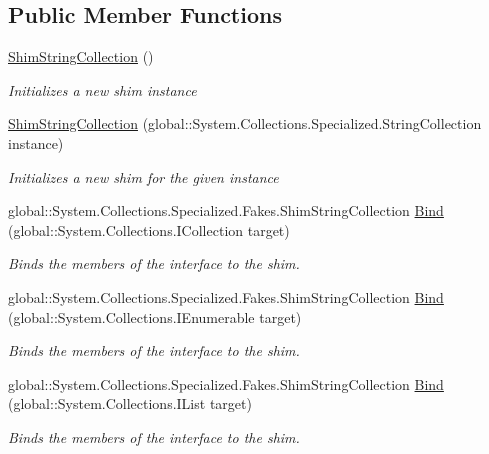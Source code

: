 \subsection*{Public Member Functions}
\begin{DoxyCompactItemize}
\item 
\hyperlink{class_system_1_1_collections_1_1_specialized_1_1_fakes_1_1_shim_string_collection_ad6c6bfb90004ff86028ca6973d882e50}{Shim\-String\-Collection} ()
\begin{DoxyCompactList}\small\item\em Initializes a new shim instance\end{DoxyCompactList}\item 
\hyperlink{class_system_1_1_collections_1_1_specialized_1_1_fakes_1_1_shim_string_collection_ada5384134f950c1ab68169c5650b3f74}{Shim\-String\-Collection} (global\-::\-System.\-Collections.\-Specialized.\-String\-Collection instance)
\begin{DoxyCompactList}\small\item\em Initializes a new shim for the given instance\end{DoxyCompactList}\item 
global\-::\-System.\-Collections.\-Specialized.\-Fakes.\-Shim\-String\-Collection \hyperlink{class_system_1_1_collections_1_1_specialized_1_1_fakes_1_1_shim_string_collection_a5789240385aa26547b0100c4504b7907}{Bind} (global\-::\-System.\-Collections.\-I\-Collection target)
\begin{DoxyCompactList}\small\item\em Binds the members of the interface to the shim.\end{DoxyCompactList}\item 
global\-::\-System.\-Collections.\-Specialized.\-Fakes.\-Shim\-String\-Collection \hyperlink{class_system_1_1_collections_1_1_specialized_1_1_fakes_1_1_shim_string_collection_ab5ca2d03e48b830fa86914641dbc6bda}{Bind} (global\-::\-System.\-Collections.\-I\-Enumerable target)
\begin{DoxyCompactList}\small\item\em Binds the members of the interface to the shim.\end{DoxyCompactList}\item 
global\-::\-System.\-Collections.\-Specialized.\-Fakes.\-Shim\-String\-Collection \hyperlink{class_system_1_1_collections_1_1_specialized_1_1_fakes_1_1_shim_string_collection_ab3e14565027bf4675609cdabd3dda203}{Bind} (global\-::\-System.\-Collections.\-I\-List target)
\begin{DoxyCompactList}\small\item\em Binds the members of the interface to the shim.\end{DoxyCompactList}\end{DoxyCompactItemize}
